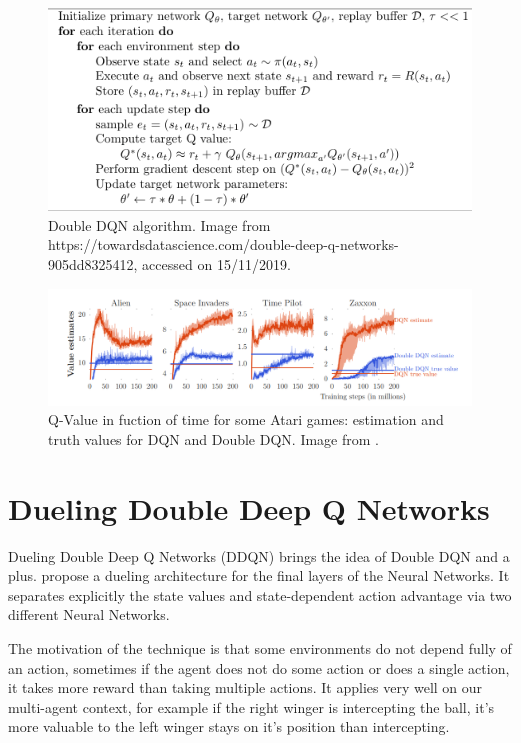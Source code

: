\begin{figure}[H]
    \centering
    \includegraphics[scale=0.8]{images/doubledqn_alg.png}
    \caption{Double DQN algorithm. Image from https://towardsdatascience.com/double-deep-q-networks-905dd8325412, accessed on 15/11/2019.}
    \label{fig:doubledqn_alg}
\end{figure}

\begin{figure}[H]
    \centering
    \includegraphics[scale=0.4]{images/double_dqn_estimation.png}
    \caption{Q-Value in fuction of time for some Atari games: estimation and truth values for DQN and Double DQN. Image from \cite{doubledqn}.}
    \label{fig:doubledqnoverestim}
\end{figure}


\section{Dueling Double Deep Q Networks}\label{section:ddqn}
Dueling Double Deep Q Networks (DDQN) brings the idea of Double DQN and a plus. \cite{DDQN} propose a dueling architecture for the final layers of the Neural Networks. It separates explicitly the state values and state-dependent action advantage via two different Neural Networks. 

The motivation of the technique is that some environments do not depend fully of an action, sometimes if the agent does not do some action or does a single action, it takes more reward than taking multiple actions. It applies very well on our multi-agent context, for example if the right winger is intercepting the ball, it's more valuable to the left winger stays on it's position than intercepting.

